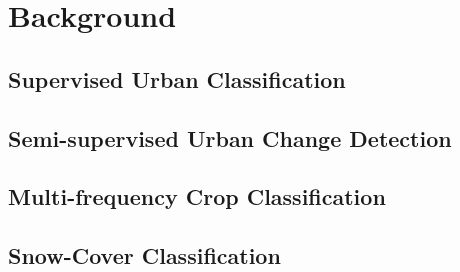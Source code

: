 \chapter{Background}


\section{Supervised Urban Classification}    

\section{Semi-supervised Urban Change Detection} 


\section{Multi-frequency Crop Classification } 

\section{Snow-Cover Classification}
